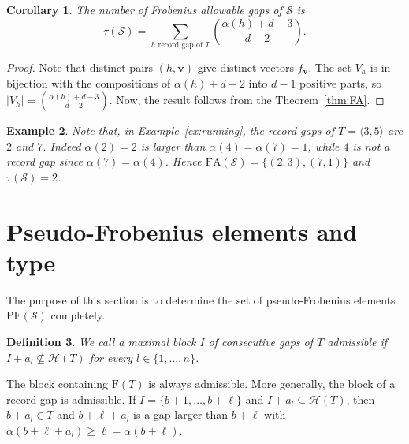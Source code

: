 \documentclass[12pt]{amsart}
\theoremstyle{plain}
\theoremstyle{theorem}
\newtheorem{definition}{Definition}[section]
\newtheorem{corollary}[definition]{Corollary}
\newtheorem{example}[definition]{Example}
\theoremstyle{remark}
\begin{document}
\begin{corollary}\label{cor:tau}
The number of Frobenius allowable gaps of $\mathcal{S}$ is
$$\tau(\mathcal{S})=\sum_{h\text{ record gap of }T}\binom{\alpha(h)+d-3}{d-2}.$$
\end{corollary}

\begin{proof}
Note that distinct pairs $(h,\mathbf{v})$ give distinct vectors $f_{\mathbf{v}}$. The set $V_h$ is in bijection with the compositions of $\alpha(h)+d-2$ into $d-1$ positive parts, so $|V_h|=\binom{\alpha(h)+d-3}{d-2}$. Now, the result follows from the Theorem~\ref{thm:FA}.
\end{proof}

\begin{example}\label{ex:running-FA}
Note that, in Example~\ref{ex:running}, the record gaps of $T=\langle3,5\rangle$ are $2$ and $7$. Indeed $\alpha(2)=2$ is larger than $\alpha(4)=\alpha(7)=1$, while $4$ is not a record gap since $\alpha(7)=\alpha(4)$. Hence $\mathrm{FA}(\mathcal{S})=\{(2,3),(7,1)\}$ and $\tau(\mathcal{S})=2$.
\end{example}

\section{Pseudo-Frobenius elements and type}\label{sec:PF}

The purpose of this section is to determine the set of pseudo-Frobenius elements $\mathrm{PF}(\mathcal{S})$ completely.

\begin{definition}
We call a maximal block $I$ of consecutive gaps of $T$ \emph{admissible} if $I+a_l\not\subseteq \mathcal{H}(T)$ for every $l\in\{1,\dots,n\}$.
\end{definition}

The block containing $\mathrm{F}(T)$ is always admissible. More generally, the block of a record gap is admissible. If $I=\{b+1,\dots,b+\ell\}$ and $I+a_l\subseteq \mathcal{H}(T)$, then $b+a_l\in T$ and $b+\ell+a_l$ is a gap larger than $b+\ell$ with $\alpha(b+\ell+a_l)\ge\ell=\alpha(b+\ell)$.
\end{document}
